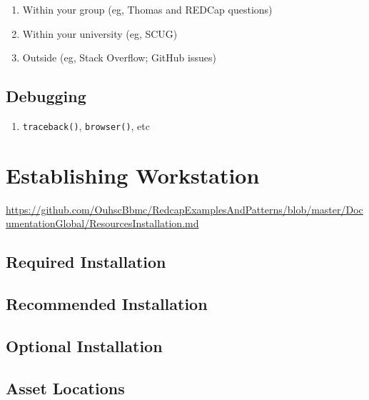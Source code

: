 \documentclass[]{book}
\providecommand{\tightlist}{%
  \setlength{\itemsep}{0pt}\setlength{\parskip}{0pt}}
\begin{document}
\begin{enumerate}
\def\labelenumi{\arabic{enumi}.}
\tightlist
\item
  Within your group (eg, Thomas and REDCap questions)
\item
  Within your university (eg, SCUG)
\item
  Outside (eg, Stack Overflow; GitHub issues)
\end{enumerate}

\hypertarget{debugging}{%
\section{Debugging}\label{debugging}}

\begin{enumerate}
\def\labelenumi{\arabic{enumi}.}
\tightlist
\item
  \texttt{traceback()}, \texttt{browser()}, etc
\end{enumerate}

\hypertarget{establishing-workstation}{%
\chapter{Establishing Workstation}\label{establishing-workstation}}

\url{https://github.com/OuhscBbmc/RedcapExamplesAndPatterns/blob/master/DocumentationGlobal/ResourcesInstallation.md}

\hypertarget{required-installation}{%
\section{Required Installation}\label{required-installation}}

\hypertarget{recommended-installation}{%
\section{Recommended Installation}\label{recommended-installation}}

\hypertarget{optional-installation}{%
\section{Optional Installation}\label{optional-installation}}

\hypertarget{asset-locations}{%
\section{Asset Locations}\label{asset-locations}}
\end{document}
